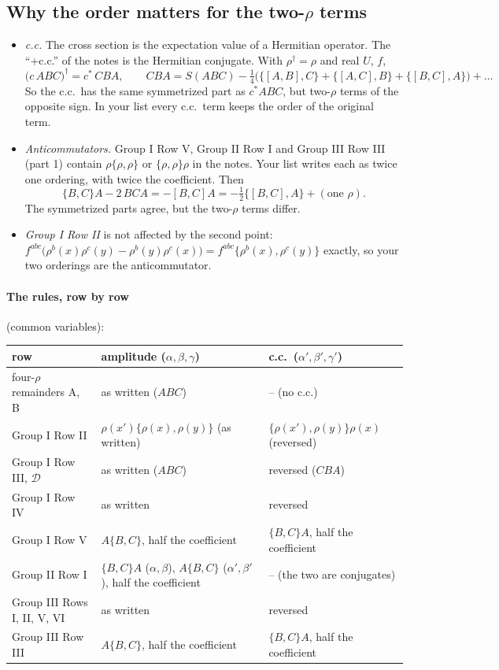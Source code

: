 \documentclass[10pt]{article}
\numberwithin{equation}{section}
\begin{document}
\subsection{Why the order matters for the two-\texorpdfstring{$\rho$}{rho} terms}
\begin{itemize}
\item \emph{c.c.} The cross section is the expectation value of a Hermitian operator. The ``+c.c.'' of the notes is the Hermitian conjugate. With $\rho^\dagger=\rho$ and real $U$, $f$,
\begin{equation}
\big(c\,ABC\big)^\dagger=c^*\,CBA,\qquad CBA=S(ABC)-\tfrac14\big(\{[A,B],C\}+\{[A,C],B\}+\{[B,C],A\}\big)+\dots
\end{equation}
So the c.c.\ has the same symmetrized part as $c^*ABC$, but two-$\rho$ terms of the opposite sign. In your list every c.c.\ term keeps the order of the original term.
\item \emph{Anticommutators.} Group I Row V, Group II Row I and Group III Row III (part 1) contain $\rho\{\rho,\rho\}$ or $\{\rho,\rho\}\rho$ in the notes. Your list writes each as twice one ordering, with twice the coefficient. Then
\begin{equation}
\{B,C\}A-2\,BCA=-[B,C]A=-\tfrac12\{[B,C],A\}+(\text{one }\rho).
\end{equation}
The symmetrized parts agree, but the two-$\rho$ terms differ.
\item \emph{Group I Row II} is not affected by the second point: $f^{abc}\big(\rho^b(x)\rho^c(y)-\rho^b(y)\rho^c(x)\big)=f^{abc}\{\rho^b(x),\rho^c(y)\}$ exactly, so your two orderings are the anticommutator.
\end{itemize}

\paragraph{The rules, row by row} (common variables):
\begin{center}\small
\begin{tabular}{@{}l l l@{}}
row & amplitude ($\alpha,\beta,\gamma$) & c.c.\ ($\alpha',\beta',\gamma'$)\\ \hline
four-$\rho$ remainders A, B & as written ($ABC$) & -- (no c.c.)\\
Group I Row II & $\rho(x')\{\rho(x),\rho(y)\}$ (as written) & $\{\rho(x'),\rho(y)\}\rho(x)$ (reversed)\\
Group I Row III, $\mathcal D$ & as written ($ABC$) & reversed ($CBA$)\\
Group I Row IV & as written & reversed\\
Group I Row V & $A\{B,C\}$, half the coefficient & $\{B,C\}A$, half the coefficient\\
Group II Row I & $\{B,C\}A$ ($\alpha,\beta$), $A\{B,C\}$ ($\alpha',\beta'$), half the coefficient & -- (the two are conjugates)\\
Group III Rows I, II, V, VI & as written & reversed\\
Group III Row III & $A\{B,C\}$, half the coefficient & $\{B,C\}A$, half the coefficient\\
\end{tabular}
\end{center}
\end{document}
